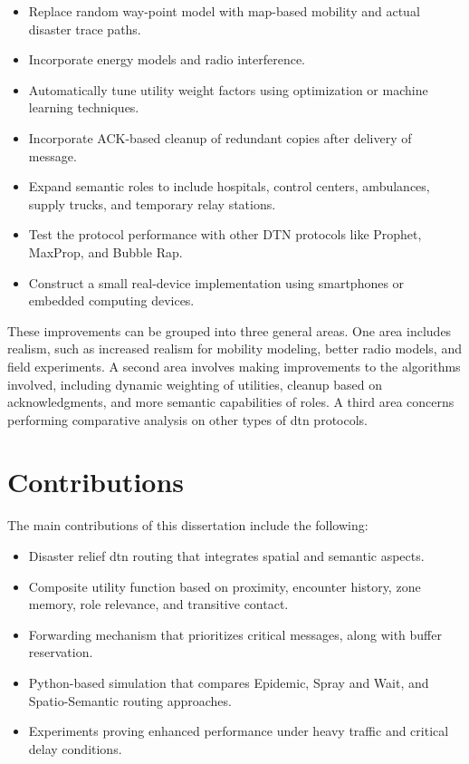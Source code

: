 \begin{itemize}
    \item Replace random way-point model with map-based mobility and actual disaster trace paths.
    \item Incorporate energy models and radio interference.
    \item Automatically tune utility weight factors using optimization or machine learning techniques.
    \item Incorporate ACK-based cleanup of redundant copies after delivery of message.
    \item Expand semantic roles to include hospitals, control centers, ambulances, supply trucks, and temporary relay stations.
    \item Test the protocol performance with other DTN protocols like Prophet, MaxProp, and Bubble Rap.
    \item Construct a small real-device implementation using smartphones or embedded computing devices.
\end{itemize}

These improvements can be grouped into three general areas. One area includes realism, such as increased realism for mobility modeling, better radio models, and field experiments. A second area involves making improvements to the algorithms involved, including dynamic weighting of utilities, cleanup based on acknowledgments, and more semantic capabilities of roles. A third area concerns performing comparative analysis on other types of \ac{dtn} protocols.

\section*{Contributions}
The main contributions of this dissertation include the following:

\begin{itemize}
	\item Disaster relief \ac{dtn} routing that integrates spatial and semantic aspects.
	\item Composite utility function based on proximity, encounter history, zone memory, role relevance, and transitive contact.
	\item Forwarding mechanism that prioritizes critical messages, along with buffer reservation.
	\item Python-based simulation that compares Epidemic, Spray and Wait, and Spatio-Semantic routing approaches.
	\item Experiments proving enhanced performance under heavy traffic and critical delay conditions.
\end{itemize}

